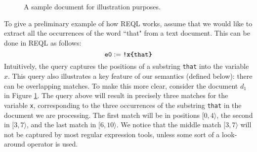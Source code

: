 \begin{figure}
	\vspace*{-7mm}
	\begin{center}
	\end{center}
	\vspace*{-7mm}
	\caption{A sample document for illustration purposes.}
	\label{fig-doc}
\end{figure}



\begin{example}\label{example:basic} To give a preliminary example of how REQL
works, assume that we would like to extract all the occurrences of the word
``that" from a text document. This can be done in REQL as follows:
$$
\texttt{e0} := \texttt{\textbf{!x\{}that\textbf{\}}}
$$
Intuitively, the query captures the positions of a substring \texttt{that} into
the variable $x$. This query also illustrates a key feature of our semantics
(defined below): there can be overlapping matches. To make this more clear,
consider the document $d_1$ in Figure \ref{fig-doc}. The query above will result
in precisely three matches for the variable \texttt{x}, corresponding to the
three occurrences of the substring \texttt{that} in the document we are
processing. The first match will be in positions $[0,4\rangle$, the second in
$[3,7\rangle$, and the last match in $[6,10\rangle$. We notice that the middle
match $[3,7\rangle$ will not be captured by most regular expression tools,
unless some sort of a look-around operator is used.
\end{example}

